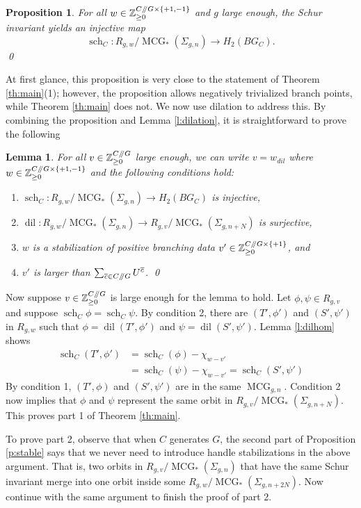 \documentclass[10pt,twocolumn,amsmath,amssymb,aps,pra,secnumarabic,
    nofootinbib,groupedaddress]{revtex4-1}
\newtheorem{proposition}[theorem]{Proposition}
\newtheorem{lemma}[theorem]{Lemma}
\newcommand{\sslash}{\mathbin{/\mkern-5mu/}}
\newcommand{\dil}{\operatorname{dil}}
\newcommand{\MCG}{\operatorname{MCG}}
\newcommand{\sch}{\operatorname{sch}}
\begin{document}
\begin{proposition}
For all $w \in \mathbb{Z}_{\ge 0}^{C\sslash G \times \{+1,-1\}}$ and $g$ large enough, the Schur invariant yields an injective map
\[ \sch_C: R_{g,w}/\MCG_*(\Sigma_{g,n}) \to H_2(BG_C). \]
\qed
\label{p:injection}
\end{proposition}

At first glance, this proposition is very close to the statement of Theorem \ref{th:main}(1); however, the proposition allows negatively trivialized branch points, while Theorem \ref{th:main} does not.  We now use dilation to address this.   By combining the proposition and Lemma \ref{l:dilation}, it is straightforward to prove the following

\begin{lemma}
For all $v \in \mathbb{Z}_{\ge 0}^{C\sslash G}$ large enough, we can write $v=w_{dil}$ where $w \in \mathbb{Z}_{\ge 0}^{C\sslash G \times \{+1,-1\}}$ and the following conditions hold:
\begin{enumerate}
\item $\sch_C: R_{g,w}/\MCG_*(\Sigma_{g,n}) \to H_2(BG_C)$ is injective,
\item $\dil: R_{g,w}/\MCG_*(\Sigma_{g,n}) \to R_{g,v}/\MCG_*(\Sigma_{g,n+N})$ is surjective,
\item $w$ is a stabilization of positive branching data $v' \in \mathbb{Z}_{\ge 0}^{C\sslash G \times \{+1\}}$, and
\item $v'$ is larger than $\sum_{\overline{c} \in C\sslash G} U^{\overline{c}}$. \qed
\end{enumerate} 
\label{l:final}
\end{lemma}

Now suppose $v \in \mathbb{Z}_{\ge 0}^{C\sslash G}$ is large enough for the lemma to hold.  Let $\phi,\psi \in R_{g,v}$ and suppose $\sch_C \phi = \sch_C \psi$.  By condition 2, there are $(T',\phi')$ and $(S',\psi')$ in $R_{g,w}$ such that $\phi = \dil(T',\phi')$ and $\psi = \dil(S',\psi')$.  Lemma \ref{l:dilhom} shows
\[ \begin{aligned}
\sch_C(T',\phi') &= \sch_C(\phi) - \chi_{w-v'} \\ &= \sch_C(\psi) - \chi_{w-v'} = \sch_C(S',\psi')
\end{aligned} \]
By condition 1, $(T',\phi)$ and $(S',\psi')$ are in the same $\MCG_{g,n}$.  Condition 2 now implies that $\phi$ and $\psi$ represent the same orbit in $R_{g,v}/\MCG_*(\Sigma_{g,n+N})$.  This proves part 1 of Theorem \ref{th:main}.

To prove part 2, observe that when $C$ generates $G$, the second part of Proposition \ref{p:stable} says that we never need to introduce handle stabilizations in the above argument.  That is, two orbits in $R_{g,v}/\MCG_*(\Sigma_{g,n})$ that have the same Schur invariant merge into one orbit inside some $R_{g,w}/\MCG_*(\Sigma_{g,n+2N})$.  Now continue with the same argument to finish the proof of part 2.
\end{document}
